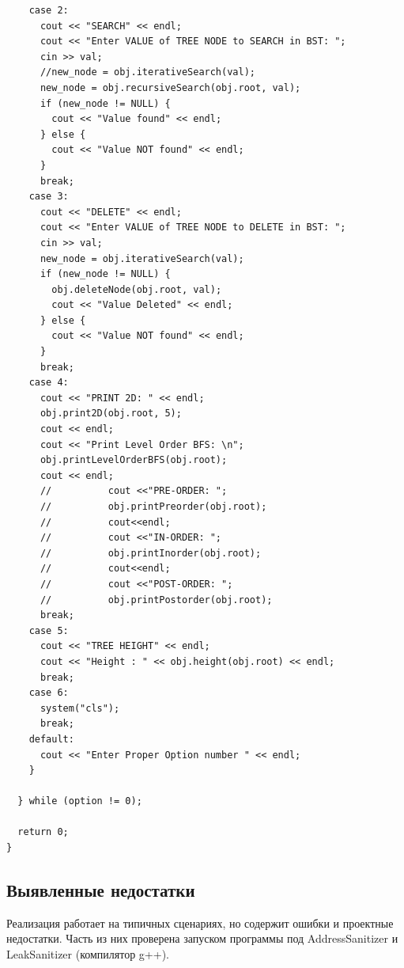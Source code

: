 \documentclass[otchet]{SCWorks}
\begin{document}
\begin{verbatim}
    case 2:
      cout << "SEARCH" << endl;
      cout << "Enter VALUE of TREE NODE to SEARCH in BST: ";
      cin >> val;
      //new_node = obj.iterativeSearch(val);
      new_node = obj.recursiveSearch(obj.root, val);
      if (new_node != NULL) {
        cout << "Value found" << endl;
      } else {
        cout << "Value NOT found" << endl;
      }
      break;
    case 3:
      cout << "DELETE" << endl;
      cout << "Enter VALUE of TREE NODE to DELETE in BST: ";
      cin >> val;
      new_node = obj.iterativeSearch(val);
      if (new_node != NULL) {
        obj.deleteNode(obj.root, val);
        cout << "Value Deleted" << endl;
      } else {
        cout << "Value NOT found" << endl;
      }
      break;
    case 4:
      cout << "PRINT 2D: " << endl;
      obj.print2D(obj.root, 5);
      cout << endl;
      cout << "Print Level Order BFS: \n";
      obj.printLevelOrderBFS(obj.root);
      cout << endl;
      //	      cout <<"PRE-ORDER: ";
      //	      obj.printPreorder(obj.root);
      //	      cout<<endl;
      //	      cout <<"IN-ORDER: ";
      //	      obj.printInorder(obj.root);
      //	      cout<<endl;
      //	      cout <<"POST-ORDER: ";
      //	      obj.printPostorder(obj.root);
      break;
    case 5:
      cout << "TREE HEIGHT" << endl;
      cout << "Height : " << obj.height(obj.root) << endl;
      break;
    case 6:
      system("cls");
      break;
    default:
      cout << "Enter Proper Option number " << endl;
    }

  } while (option != 0);

  return 0;
}
\end{verbatim}

\subsection{Выявленные недостатки}

Реализация работает на типичных сценариях, но содержит ошибки и
проектные недостатки. Часть из них проверена запуском программы под
AddressSanitizer и LeakSanitizer (компилятор g++).
\end{document}
